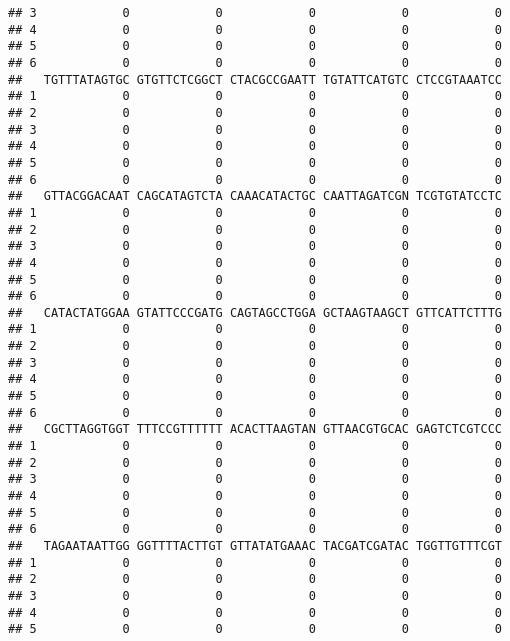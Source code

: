 \documentclass[]{article}
\begin{document}
\begin{verbatim}
## 3            0            0            0            0            0
## 4            0            0            0            0            0
## 5            0            0            0            0            0
## 6            0            0            0            0            0
##   TGTTTATAGTGC GTGTTCTCGGCT CTACGCCGAATT TGTATTCATGTC CTCCGTAAATCC
## 1            0            0            0            0            0
## 2            0            0            0            0            0
## 3            0            0            0            0            0
## 4            0            0            0            0            0
## 5            0            0            0            0            0
## 6            0            0            0            0            0
##   GTTACGGACAAT CAGCATAGTCTA CAAACATACTGC CAATTAGATCGN TCGTGTATCCTC
## 1            0            0            0            0            0
## 2            0            0            0            0            0
## 3            0            0            0            0            0
## 4            0            0            0            0            0
## 5            0            0            0            0            0
## 6            0            0            0            0            0
##   CATACTATGGAA GTATTCCCGATG CAGTAGCCTGGA GCTAAGTAAGCT GTTCATTCTTTG
## 1            0            0            0            0            0
## 2            0            0            0            0            0
## 3            0            0            0            0            0
## 4            0            0            0            0            0
## 5            0            0            0            0            0
## 6            0            0            0            0            0
##   CGCTTAGGTGGT TTTCCGTTTTTT ACACTTAAGTAN GTTAACGTGCAC GAGTCTCGTCCC
## 1            0            0            0            0            0
## 2            0            0            0            0            0
## 3            0            0            0            0            0
## 4            0            0            0            0            0
## 5            0            0            0            0            0
## 6            0            0            0            0            0
##   TAGAATAATTGG GGTTTTACTTGT GTTATATGAAAC TACGATCGATAC TGGTTGTTTCGT
## 1            0            0            0            0            0
## 2            0            0            0            0            0
## 3            0            0            0            0            0
## 4            0            0            0            0            0
## 5            0            0            0            0            0

\end{verbatim}
\end{document}
